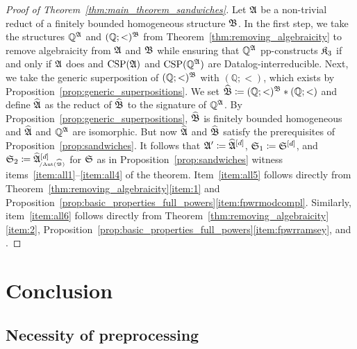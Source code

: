 \begin{proof}[Proof of Theorem~\ref{thm:main_theorem_sandwiches}] Let $\mathfrak{A}$ be a non-trivial reduct of a finitely bounded homogeneous structure $\mathfrak{B}$. 
    In the first step, we take the structures $\mathbb{Q}^{\mathfrak{A}}$ and $(\mathbb{Q};<)^{\mathfrak{B}}$ from Theorem~\ref{thm:removing_algebraicity} to remove algebraicity from $\mathfrak{A}$ and $\mathfrak{B}$ while ensuring that $\mathfrak{\mathbb{Q}^{\mathfrak{A}}}$ pp-constructs $\mathfrak{K}_3$ if and only if $\mathfrak{A}$ does and $\mathrm{CSP}(\mathfrak{A})$ and $\mathrm{CSP}(\mathbb{Q}^{\mathfrak{A}})$ are Datalog-interreducible.
    Next, we take the generic superposition of $(\mathbb{Q};<)^{\mathfrak{B}}$ with $(\mathbb{Q};<)$, which exists by Proposition~\ref{prop:generic_superpositions}.
    We set $\widehat{\mathfrak{B}}\mathrel{\mathop:}\mathrel{\mkern-1.2mu}=  (\mathbb{Q};<)^{\mathfrak{B}} \ast (\mathbb{Q};<)$ and define $\widehat{\mathfrak{A}}$ as the reduct of $\widehat{\mathfrak{B}}$ to the signature of $\mathbb{Q}^{\mathfrak{A}}$. 
     By Proposition~\ref{prop:generic_superpositions}, $\widehat{\mathfrak{B}}$ is finitely bounded homogeneous and $\widehat{\mathfrak{A}}$ and $\mathbb{Q}^{\mathfrak{A}}$ are isomorphic.
    But now $\widehat{\mathfrak{A}}$ and $\widehat{\mathfrak{B}}$ satisfy the prerequisites of Proposition~\ref{prop:sandwiches}.
    It follows that $\mathfrak{A}'\mathrel{\mathop:}\mathrel{\mkern-1.2mu}= {\widehat{\mathfrak{A}}}^{[d]}$, $\mathfrak{S}_1\mathrel{\mathop:}\mathrel{\mkern-1.2mu}=  {\mathfrak{S}}^{[d]}$, and $ \struct{S}_2\coloneqq \fpwr{\widehat{\struct{A}}}{d}_{\orbeq{\Aut(\widehat{\struct{B}})}}$ for $\mathfrak{S}$ as in Proposition~\ref{prop:sandwiches} witness 
    items~\ref{item:all1}--\ref{item:all4} of the theorem. 
    Item~\ref{item:all5} follows directly from Theorem~\ref{thm:removing_algebraicity}\eqref{item:1} and Proposition~\ref{prop:basic_properties_full_powers}\eqref{item:fpwrmodcompl}.
    Similarly, item~\ref{item:all6} follows directly from Theorem~\ref{thm:removing_algebraicity}\eqref{item:2}, Proposition~\ref{prop:basic_properties_full_powers}\eqref{item:fpwrramsey}, and \cite[Theorem~1.5]{bodirsky2014new}.
\end{proof}

\section{Conclusion}\label{sect:conclusion} 

\subsection{Necessity of preprocessing} 

